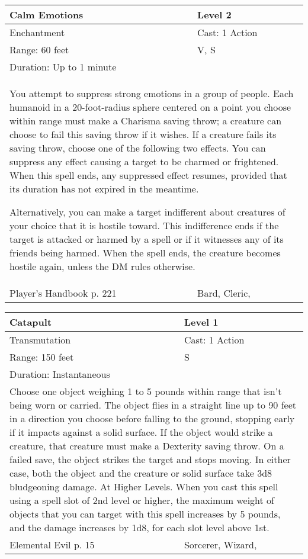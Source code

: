 \documentclass[11pt]{report}
\begin{document}
\begin{table}[H]
	\begin{tabular}{||p{6cm}|p{6cm}||}
		\hline\hline
		\bf{Calm Emotions} & Level 2\\ \hline
		Enchantment & Cast: 1 Action\\ \hline
		Range: 60 feet & V, S\\ \hline
		Duration: Up to 1 minute & \\ \hline
		\multicolumn{2}{||p{12cm}||}{You attempt to suppress strong emotions in a group of people. 
Each humanoid in a 20-foot-radius sphere centered on a point you choose within range must make a Charisma saving throw; a creature can choose to fail this saving throw if it wishes. If a creature fails its saving throw, choose one of the following two effects. You can suppress any effect causing a target to be charmed or frightened. When this spell ends, any suppressed effect resumes, provided that its duration has not expired in the meantime. 

Alternatively, you can make a target indifferent about creatures of your choice that it is hostile toward. This indifference ends if the target is attacked or harmed by a spell or if it witnesses any of its friends being harmed. When the spell ends, the creature becomes hostile again, unless the DM rules otherwise.}\\ \hline
Player's Handbook p. 221 & Bard, Cleric, \\ \hline\hline
	\end{tabular}
\end{table}

\begin{table}[H]
	\begin{tabular}{||p{6cm}|p{6cm}||}
		\hline\hline
		\bf{Catapult} & Level 1\\ \hline
		Transmutation & Cast: 1 Action\\ \hline
		Range: 150 feet & S\\ \hline
		Duration: Instantaneous & \\ \hline
		\multicolumn{2}{||p{12cm}||}{Choose one object weighing 1 to 5 pounds within range that isn’t being worn or carried. The object flies in a straight line up to 90 feet in a direction you choose before falling to the ground, stopping early if it impacts against a solid surface. If the object would strike a creature, that creature must make a Dexterity saving throw. On a failed save, the object strikes the target and stops moving. In either case, both the object and the creature or solid surface take 3d8 bludgeoning damage.
At Higher Levels. When you cast this spell using a spell slot of 2nd level or higher, the maximum weight of objects that you can target with this spell increases by 5 pounds, and the damage increases by 1d8, for each slot level above 1st.}\\ \hline
Elemental Evil p. 15 & Sorcerer, Wizard, \\ \hline\hline
	\end{tabular}
\end{table}
\end{document}
